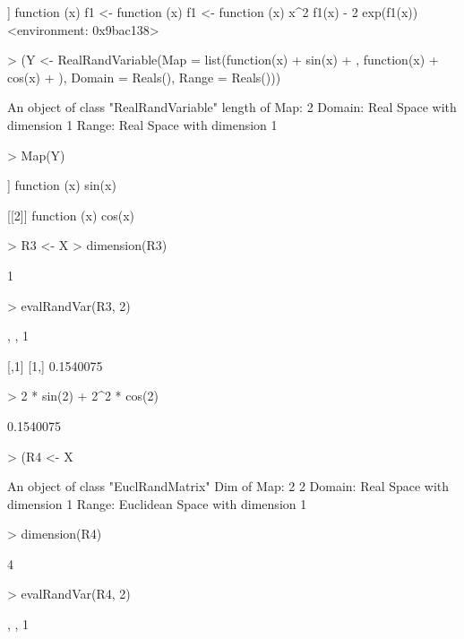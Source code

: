 \documentclass[11pt]{article}
\begin{document}
\begin{Schunk}
\begin{Soutput}
[[2]]
function (x) 
{
    f1 <- function (x) 
    {
        f1 <- function (x) 
        {
            x^2
        }
        f1(x) - 2
    }
    exp(f1(x))
}
<environment: 0x9bac138>
\end{Soutput}
\begin{Sinput}
> (Y <- RealRandVariable(Map = list(function(x) {
+     sin(x)
+ }, function(x) {
+     cos(x)
+ }), Domain = Reals(), Range = Reals()))
\end{Sinput}
\begin{Soutput}
An object of class "RealRandVariable" 
length of Map:	 2 
Domain:	Real Space with dimension 1 
Range:	Real Space with dimension 1 
\end{Soutput}
\begin{Sinput}
> Map(Y)
\end{Sinput}
\begin{Soutput}
[[1]]
function (x) 
{
    sin(x)
}

[[2]]
function (x) 
{
    cos(x)
}
\end{Soutput}
\begin{Sinput}
> R3 <- X %
> dimension(R3)
\end{Sinput}
\begin{Soutput}
[1] 1
\end{Soutput}
\begin{Sinput}
> evalRandVar(R3, 2)
\end{Sinput}
\begin{Soutput}
, , 1

          [,1]
[1,] 0.1540075
\end{Soutput}
\begin{Sinput}
> 2 * sin(2) + 2^2 * cos(2)
\end{Sinput}
\begin{Soutput}
[1] 0.1540075
\end{Soutput}
\begin{Sinput}
> (R4 <- X %
\end{Sinput}
\begin{Soutput}
An object of class "EuclRandMatrix" 
Dim of Map:	 2 2 
Domain:	Real Space with dimension 1 
Range:	Euclidean Space with dimension 1 
\end{Soutput}
\begin{Sinput}
> dimension(R4)
\end{Sinput}
\begin{Soutput}
[1] 4
\end{Soutput}
\begin{Sinput}
> evalRandVar(R4, 2)
\end{Sinput}
\begin{Soutput}
, , 1


\end{Soutput}
\end{Schunk}
\end{document}
